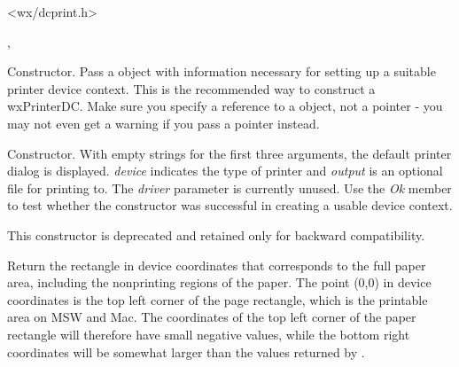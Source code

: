 
<wx/dcprint.h>


, 



\label{wxprinterdcctor}


Constructor. Pass a  object with information
necessary for setting up a suitable printer device context. This
is the recommended way to construct a wxPrinterDC.  Make sure you 
specify a reference to a  object,
not a pointer - you may not even get a warning if you pass a pointer
instead.


Constructor. With empty strings for the first three arguments, the default printer dialog is
displayed. {\it device} indicates the type of printer and {\it output}
is an optional file for printing to. The {\it driver} parameter is
currently unused.  Use the {\it Ok} member to test whether the
constructor was successful in creating a usable device context.

This constructor is deprecated and retained only for backward compatibility.

\label{wxprinterdcgetpaperrect}


Return the rectangle in device coordinates that corresponds to the full paper
area, including the nonprinting regions of the paper. The point (0,0) in device
coordinates is the top left corner of the page rectangle, which is the printable
area on MSW and Mac. The coordinates of the top left corner of the paper
rectangle will therefore have small negative values, while the bottom right
coordinates will be somewhat larger than the values returned by
.


\section{}\label{wxprintout}

